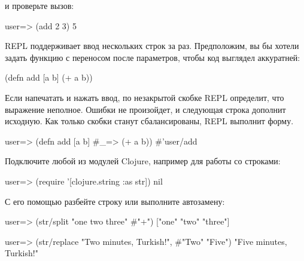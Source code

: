 и проверьте вызов:

\begin{english}
  \begin{clojure}
user=> (add 2 3)
5
  \end{clojure}
\end{english}

REPL поддерживает ввод нескольких строк за раз. Предположим, вы бы хотели задать функцию с переносом после параметров, чтобы код выглядел аккуратней:

\begin{english}
  \begin{clojure}
(defn add [a b]
  (+ a b))
  \end{clojure}
\end{english}

Если напечатать  и нажать ввод, по незакрытой скобке REPL определит, что выражение неполное. Ошибки не произойдет, и следующая строка дополнит исходную. Как только скобки станут сбалансированы, REPL выполнит форму.

\begin{english}
  \begin{clojure}
user=> (defn add [a b]
  #_=> (+ a b))
#'user/add
  \end{clojure}
\end{english}

Подключите любой из модулей Clojure, например  для работы со строками:

\begin{english}
  \begin{clojure}
user=> (require '[clojure.string :as str])
nil
  \end{clojure}
\end{english}

С его помощью разбейте строку или выполните автозамену:

\begin{english}
  \begin{clojure}
user=> (str/split "one two three" #"\s+")
["one" "two" "three"]
  \end{clojure}
\end{english}

\begin{english}
  \begin{clojure}
user=> (str/replace "Two minutes, Turkish!", #"Two" "Five")
"Five minutes, Turkish!"
  \end{clojure}
\end{english}

